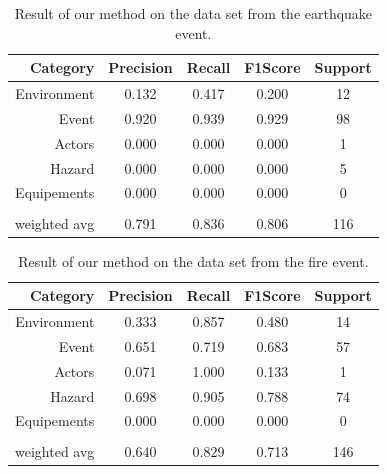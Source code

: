 \begin{table}[bp]
    \centering
    \caption{Result of our method on the data set from the earthquake event.}
    \begin{tabular}{rcccc}
        Category     & Precision & Recall & F1\-Score & Support \\
        \toprule
        Environment  & 0.132     & 0.417  & 0.200     & 12      \\
        Event        & 0.920     & 0.939  & 0.929     & 98      \\
        Actors       & 0.000     & 0.000  & 0.000     & 1       \\
        Hazard       & 0.000     & 0.000  & 0.000     & 5       \\
        Equipements  & 0.000     & 0.000  & 0.000     & 0       \\
                     &           &        &           &         \\
        weighted avg & 0.791     & 0.836  & 0.806     & 116     \\
        \bottomrule
    \end{tabular}
    \label{table:earthquake-results}
\end{table}

\begin{table}[bp]
    \centering
    \caption{Result of our method on the data set from the fire event.}
    \begin{tabular}{rcccc}
        Category     & Precision & Recall & F1\-Score & Support \\
        \toprule
        Environment  & 0.333     & 0.857  & 0.480     & 14      \\
        Event        & 0.651     & 0.719  & 0.683     & 57      \\
        Actors       & 0.071     & 1.000  & 0.133     & 1       \\
        Hazard       & 0.698     & 0.905  & 0.788     & 74      \\
        Equipements  & 0.000     & 0.000  & 0.000     & 0       \\
                     &           &        &           &         \\
        weighted avg & 0.640     & 0.829  & 0.713     & 146     \\
        \bottomrule
    \end{tabular}
    \label{table:fire-results}
\end{table}

